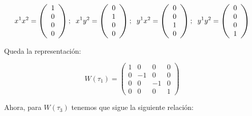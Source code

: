 \documentclass{article}
\begin{document}
\begin{enumerate}
\begin{enumerate}
        $$x^1x^2=\left( \begin{array}{c}
             1  \\
             0 \\
             0 \\
             0
        \end{array} \right ); \hspace{0.2cm} x^1y^2=\left( \begin{array}{c}
             0  \\
             1 \\
             0 \\
             0
        \end{array} \right ); \hspace{0.2cm} y^1x^2=\left( \begin{array}{c}
             0  \\
             0 \\
             1 \\
             0
        \end{array} \right ); \hspace{0.2cm} y^1y^2=\left( \begin{array}{c}
             0  \\
             0 \\
             0 \\
             1
        \end{array} \right )$$
        
        Queda la representación:
        
        $$W(\tau _1)=\left (\begin{array}{cccc}
           1  & 0 & 0 & 0 \\
           0  & -1 & 0 & 0 \\
             0 & 0 & -1 & 0 \\
             0 & 0 & 0 & 1
        \end{array} \right)$$
        
        Ahora, para $W(\tau _3)$ tenemos que sigue la siguiente relación:
        

\end{enumerate}
\end{enumerate}
\end{document}
